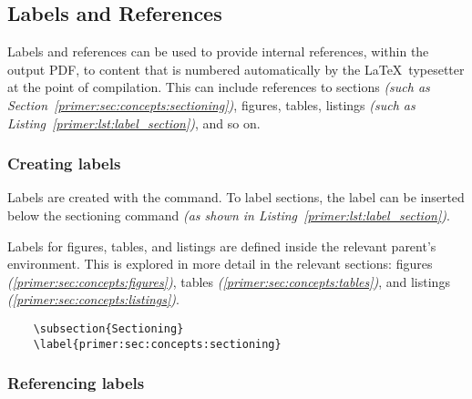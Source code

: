 \subsection{Labels and References}
Labels and references can be used to provide internal references, within the output PDF, to content that is numbered automatically by the \LaTeX\ typesetter at the point of compilation. This can include references to sections \textit{(such as Section~\ref{primer:sec:concepts:sectioning})}, figures, tables, listings \textit{(such as Listing~\ref{primer:lst:label_section})}, and so on.

\subsubsection*{Creating labels}
Labels are created with the  command. To label sections, the label can be inserted below the sectioning command \textit{(as shown in Listing~\ref{primer:lst:label_section})}.

Labels for figures, tables, and listings are defined inside the relevant parent's environment. This is explored in more detail in the relevant sections: figures \textit{(\ref{primer:sec:concepts:figures})}, tables \textit{(\ref{primer:sec:concepts:tables})}, and listings \textit{(\ref{primer:sec:concepts:listings})}.


\begin{listing}[H]
  \captionsetup{skip=\skiplistingcaptionlen}
  \begin{verbatim}
    \subsection{Sectioning}
    \label{primer:sec:concepts:sectioning}
  \end{verbatim}
  \caption{\texttt{\textbackslash label} sectioning command example}
  \label{primer:lst:label_section}
\end{listing}

\subsubsection*{Referencing labels}
